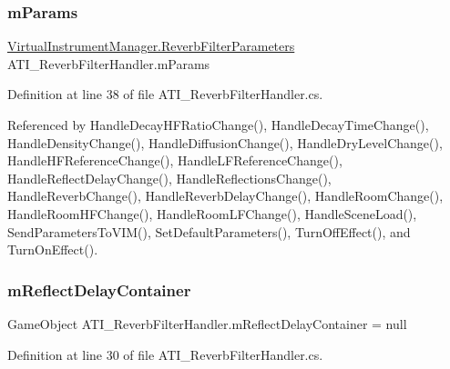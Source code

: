\subsubsection{\texorpdfstring{m\+Params}{mParams}}
{\footnotesize\ttfamily \hyperlink{group__filter_params_struct_virtual_instrument_manager_1_1_reverb_filter_parameters}{Virtual\+Instrument\+Manager.\+Reverb\+Filter\+Parameters} A\+T\+I\+\_\+\+Reverb\+Filter\+Handler.\+m\+Params\hspace{0.3cm}{\ttfamily [private]}}



Definition at line 38 of file A\+T\+I\+\_\+\+Reverb\+Filter\+Handler.\+cs.



Referenced by Handle\+Decay\+H\+F\+Ratio\+Change(), Handle\+Decay\+Time\+Change(), Handle\+Density\+Change(), Handle\+Diffusion\+Change(), Handle\+Dry\+Level\+Change(), Handle\+H\+F\+Reference\+Change(), Handle\+L\+F\+Reference\+Change(), Handle\+Reflect\+Delay\+Change(), Handle\+Reflections\+Change(), Handle\+Reverb\+Change(), Handle\+Reverb\+Delay\+Change(), Handle\+Room\+Change(), Handle\+Room\+H\+F\+Change(), Handle\+Room\+L\+F\+Change(), Handle\+Scene\+Load(), Send\+Parameters\+To\+V\+I\+M(), Set\+Default\+Parameters(), Turn\+Off\+Effect(), and Turn\+On\+Effect().

\mbox{\label{class_a_t_i___reverb_filter_handler_a8344d44e118de9b321cdf0b84a383f89}} 
\subsubsection{\texorpdfstring{m\+Reflect\+Delay\+Container}{mReflectDelayContainer}}
{\footnotesize\ttfamily Game\+Object A\+T\+I\+\_\+\+Reverb\+Filter\+Handler.\+m\+Reflect\+Delay\+Container = null\hspace{0.3cm}{\ttfamily [private]}}



Definition at line 30 of file A\+T\+I\+\_\+\+Reverb\+Filter\+Handler.\+cs.

\mbox{\label{class_a_t_i___reverb_filter_handler_a03319a2f6cc8e26f074789fb525584e7}} 
